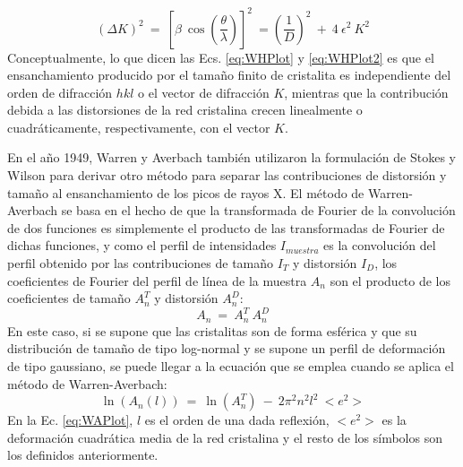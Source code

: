  \begin{equation}
  (\Delta K)^2 \ = \ \left[\beta \ \cos\left(\frac{\theta}{\lambda}\right)\right]^2 \ = \left(\frac{1}{D}\right)^2 \ + \ 4 \ \epsilon^2 \ K^2
  \label{eq:WHPlot2}
\end{equation}
\noindent
Conceptualmente, lo que dicen las Ecs. \ref{eq:WHPlot} y \ref{eq:WHPlot2} es que el ensanchamiento producido por el tamaño finito de cristalita es independiente del orden de difracción $hkl$ o el vector de difracción $K$, mientras que la contribución debida a las  distorsiones de la red cristalina crecen linealmente o cuadráticamente, respectivamente, con el vector $K$.

En el año 1949, Warren y Averbach\cite{WarrenAverbach1949} también utilizaron la formulación de Stokes y Wilson para derivar otro método para separar las contribuciones de distorsión y tamaño al ensanchamiento de los picos de rayos X. 
El método de Warren-Averbach se basa en el hecho de que la transformada de Fourier de la convolución de dos funciones es simplemente el producto de las transformadas de Fourier de dichas funciones, y como el perfil de intensidades $I_{muestra}$ es la convolución del perfil obtenido por las contribuciones de tamaño $I_{T}$ y distorsión $I_{D}$, los coeficientes de Fourier del perfil de línea de la muestra $A_n$ son el producto de los coeficientes de tamaño $A_n^T$ y distorsión $A_n^D$:
\begin{equation}
  A_n \ = \ A_n^T \ A_n^D
  \label{eq:FCoeff}
 \end{equation}
\noindent
En este caso, si se supone que las cristalitas son de forma esférica y que su distribución de tamaño de tipo log-normal\cite{WikiLognormal} y se supone un perfil de deformación de tipo gaussiano, se puede llegar a la ecuación que se emplea cuando se aplica el método de Warren-Averbach:
\begin{equation}
  \ln(A_n(l)) \ = \ \ln(A_n^T) \ - \ 2 \pi^2 n^2 l^2 \ <e^2>
  \label{eq:WAPlot}
 \end{equation}
\noindent
En la Ec. \ref{eq:WAPlot}, $l$ es el orden de una dada reflexión, $<e^2>$ es la deformación cuadrática media de la red cristalina y el resto de los símbolos son los definidos anteriormente.


